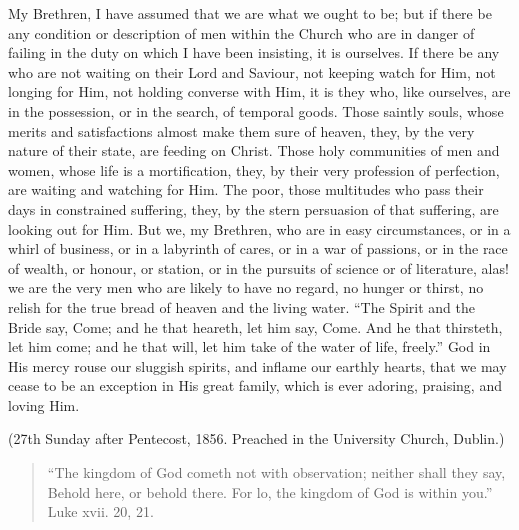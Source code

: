 My Brethren, I have assumed that we are what we ought
to be; but if there be any condition or description of
men within the Church who are in danger of failing in the
duty on which I have been insisting, it is ourselves. If
there be any who are not waiting on their Lord and
Saviour, not keeping watch for Him, not longing for Him,
not holding converse with Him, it is they who, like
ourselves, are in the possession, or in the search, of
temporal goods. Those saintly souls, whose merits and
satisfactions almost make them sure of heaven, they, by
the very nature of their state, are feeding on Christ.
Those holy communities of men and women, whose life is a
mortification, they, by their very profession of
perfection, are waiting and watching for Him. The poor,
those multitudes who pass their days in constrained
suffering, they, by the stern persuasion of that
suffering, are looking out for Him. But we, my Brethren,
who are in easy circumstances, or in a whirl of business,
or in a labyrinth of cares, or in a war of passions, or
in the race of wealth, or honour, or station, or in the
pursuits of science or of literature, alas! we are the
very men who are likely to have no regard, no hunger or
thirst, no relish for the true bread of heaven and the
living water. ``The Spirit and the Bride say, Come;
and he that heareth, let him say, Come. And he that
thirsteth, let him come; and he that will, let him take of
the water of life, freely.'' God in His mercy rouse
our sluggish spirits, and inflame our earthly hearts,
that we may cease to be an exception in His great family,
which is ever adoring, praising, and loving Him.

(27th Sunday after Pentecost, 1856. Preached in the
University Church, Dublin.)


\begin{quote}

``The kingdom of God cometh not with
observation; neither shall they say, Behold here, or
behold there. For lo, the kingdom of God is within
you.'' Luke xvii. 20, 21.

\end{quote}

